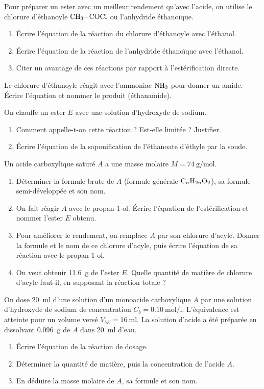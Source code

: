 \exo{} Pour préparer un ester avec un meilleur rendement qu'avec l'acide, on
utilise le chlorure d'éthanoyle $\ce{CH3-COCl}$ ou l'anhydride éthanoïque.
\begin{enumerate}[label=\arabic*)]
\item Écrire l'équation de la réaction du chlorure d'éthanoyle avec l'éthanol.
\item Écrire l'équation de la réaction de l'anhydride éthanoïque avec l'éthanol.
\item Citer un avantage de ces réactions par rapport à l'estérification directe.
\end{enumerate}

\exo{} Le chlorure d'éthanoyle réagit avec l'ammoniac $\ce{NH3}$ pour donner
un amide. Écrire l'équation et nommer le produit (éthanamide).


\exo{} On chauffe un ester $E$ avec une solution d'hydroxyde de sodium.
\begin{enumerate}[label=\arabic*)]
\item Comment appelle-t-on cette réaction ? Est-elle limitée ? Justifier.
\item Écrire l'équation de la saponification de l'éthanoate d'éthyle par la soude.
\end{enumerate}


Un acide carboxylique saturé $A$ a une masse molaire $M = \SI{74}{\gram\per\mol}$.
\begin{enumerate}[label=\arabic*)]
\item Déterminer la formule brute de $A$ (formule générale $\ce{C_nH_{2n}O2}$), sa
formule semi-développée et son nom.
\item On fait réagir $A$ avec le propan-1-ol. Écrire l'équation de l'estérification
et nommer l'ester $E$ obtenu.
\item Pour améliorer le rendement, on remplace $A$ par son chlorure d'acyle. Donner
la formule et le nom de ce chlorure d'acyle, puis écrire l'équation de sa réaction
avec le propan-1-ol.
\item On veut obtenir \SI{11.6}{\gram} de l'ester $E$. Quelle quantité de matière de
chlorure d'acyle faut-il, en supposant la réaction totale ?
\end{enumerate}

On dose \SI{20}{\milli\litre} d'une solution d'un monoacide carboxylique $A$ par une
solution d'hydroxyde de sodium de concentration $C_b = \SI{0.10}{\mol\per\litre}$.
L'équivalence est atteinte pour un volume versé $V_{bE} = \SI{16}{\milli\litre}$.
La solution d'acide a été préparée en dissolvant \SI{0.096}{\gram} de $A$ dans
\SI{20}{\milli\litre} d'eau.
\begin{enumerate}[label=\arabic*)]
\item Écrire l'équation de la réaction de dosage.
\item Déterminer la quantité de matière, puis la concentration de l'acide $A$.
\item En déduire la masse molaire de $A$, sa formule et son nom.
\end{enumerate}
